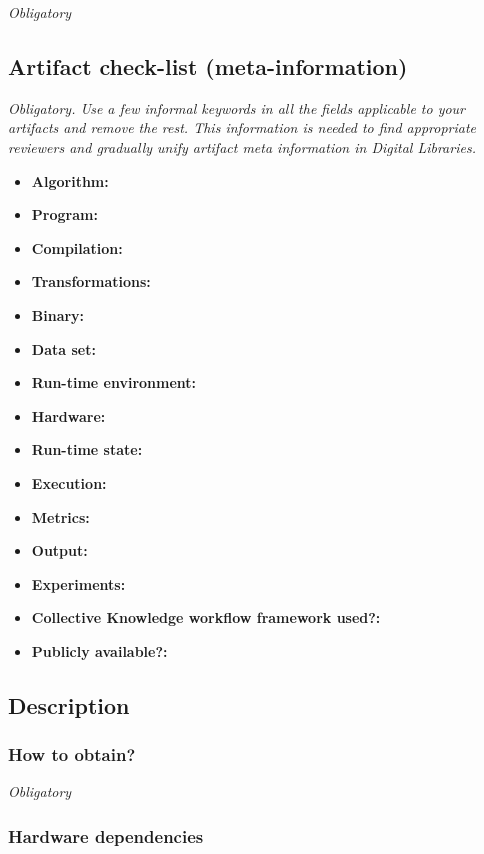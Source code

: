 \documentclass{sigplanconf}
\begin{document}
{\em Obligatory}

\subsection{Artifact check-list (meta-information)}

{\em Obligatory. Use a few informal keywords in all the fields applicable to your artifacts
and remove the rest. This information is needed to find appropriate reviewers and gradually 
unify artifact meta information in Digital Libraries.}

{\small
\begin{itemize}
  \item {\bf Algorithm: }
  \item {\bf Program: }
  \item {\bf Compilation: }
  \item {\bf Transformations: }
  \item {\bf Binary: }
  \item {\bf Data set: }
  \item {\bf Run-time environment: }
  \item {\bf Hardware: }
  \item {\bf Run-time state: }
  \item {\bf Execution: }
  \item {\bf Metrics: }
  \item {\bf Output: }
  \item {\bf Experiments: }
  \item {\bf Collective Knowledge workflow framework used?: } 
  \item {\bf Publicly available?: }
\end{itemize}

\subsection{Description}

\subsubsection{How to obtain?}

{\em Obligatory}

\subsubsection{Hardware dependencies}

}
\end{document}
